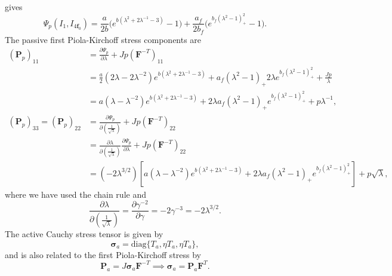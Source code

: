 gives \[
\begin{equation}
\Psi_{p}(I_{1},I_{4\mathbf{f}_{0}})  = \frac{a}{2b}\bigg(e^{ b(\lambda^2 +2\lambda^{-1}-3) }-1\bigg)  + \frac{a_{f}}{2b_{f}}\bigg(e^{ b_{f}(\lambda^2-1)^2_{+}}-1\bigg).
\end{equation}
\] The passive first Piola-Kirchoff stress components are \[
\begin{align}
(\mathbf{P}_{p})_{11} & =\frac{ \partial \Psi_{p} }{ \partial \lambda } +Jp(\mathbf{F}^{-T})_{11} \\
 & = \frac{a}{2}(2\lambda -2\lambda^{-2})e^{ b\left( \lambda^2 +2\lambda^{-1}-3 \right) }+ a_{f}(\lambda^2-1)_{+}2\lambda e^{ b_{f}(\lambda^2-1)^2_{+} }+\frac{Jp}{\lambda} \\
  & =a(\lambda-\lambda^{-2})e^{ b(\lambda^2+2\lambda^{-1}-3) }+2\lambda a_{f}(\lambda^2-1)_{+}e^{ b_{f}(\lambda^2-1)_{+}^2 }+p\lambda^{-1},\\
(\mathbf{P}_{p})_{33}=(\mathbf{P}_{p})_{22} & =\frac{ \partial \Psi_{p} }{ \partial \left( \frac{1}{\sqrt{ \lambda }} \right) }  + Jp(\mathbf{F}^{-T})_{22}\\
 & =\frac{ \partial \lambda }{ \partial \left( \frac{1}{\sqrt{ \lambda }} \right) } \frac{ \partial \Psi_{p} }{ \partial \lambda } +Jp(\mathbf{F}^{-T})_{22} \\
 & = (-2\lambda^{3/2})\left[ a(\lambda-\lambda^{-2})e^{ b(\lambda^2+2\lambda^{-1}-3) }+2\lambda a_{f}(\lambda^2-1)_{+}e^{ b_{f}(\lambda^2-1)_{+}^2 } \right] +p\sqrt{ \lambda },
\end{align}
\] where we have used the chain rule and \[
\begin{equation}
\frac{ \partial \lambda }{ \partial\left(  \frac{1}{\sqrt{ \lambda }} \right) } =\frac{ \partial \gamma^{-2} }{ \partial \gamma } =-2\gamma^{-3}=-2\lambda^{3/2}.
\end{equation}
\] The active Cauchy stress tensor is given by \[
\begin{equation}
\boldsymbol{\sigma}_{a}=\text{diag}\{T_{a}, \eta T_{a},\eta T_{a}\},
\end{equation}
\] and is also related to the first Piola-Kirchoff stress by \[
\begin{equation}
\mathbf{P}_{a}=J\boldsymbol{\sigma}_{a}\mathbf{F}^{-T}\implies \boldsymbol{\sigma}_{a}=\mathbf{P}_{a}\mathbf{F}^T.
\end{equation}
\]

